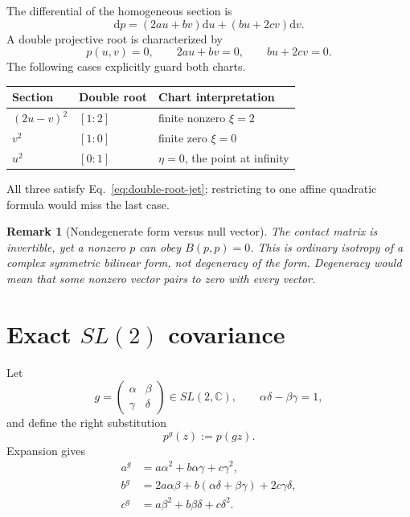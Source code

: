 \documentclass[11pt]{article}
\numberwithin{equation}{section}
\newcommand{\CC}{\mathbb C}
\newcommand{\dd}{\mathrm d}
\newtheorem{remark}[theorem]{Remark}
\begin{document}
The differential of the homogeneous section is
\begin{equation}
 \dd p=(2au+bv)\dd u+(bu+2cv)\dd v.
 \label{eq:first-jet}
\end{equation}
A double projective root is characterized by
\begin{equation}
 p(u,v)=0,
 \qquad 2au+bv=0,
 \qquad bu+2cv=0.
 \label{eq:double-root-jet}
\end{equation}
The following cases explicitly guard both charts.
\begin{center}
\begin{tabular}{@{}lll@{}}
\toprule
Section & Double root & Chart interpretation\\
\midrule
\((2u-v)^2\) & \([1:2]\) & finite nonzero \(\xi=2\)\\
\(v^2\) & \([1:0]\) & finite zero \(\xi=0\)\\
\(u^2\) & \([0:1]\) & \(\eta=0\), the point at infinity\\
\bottomrule
\end{tabular}
\end{center}
All three satisfy Eq.~\eqref{eq:double-root-jet}; restricting to one affine
quadratic formula would miss the last case.

\begin{remark}[Nondegenerate form versus null vector]
The contact matrix is invertible, yet a nonzero \(p\) can obey
\(B(p,p)=0\).  This is ordinary isotropy of a complex symmetric bilinear form,
not degeneracy of the form.  Degeneracy would mean that some nonzero vector
pairs to zero with \emph{every} vector.
\end{remark}

\section{Exact \texorpdfstring{$SL(2)$}{SL(2)} covariance}

Let
\begin{equation}
 g=\begin{pmatrix}\alpha&\beta\\\gamma&\delta\end{pmatrix}
 \in SL(2,\CC),
 \qquad \alpha\delta-\beta\gamma=1,
 \label{eq:g-matrix}
\end{equation}
and define the right substitution
\begin{equation}
 p^g(z):=p(gz).
 \label{eq:right-substitution}
\end{equation}
Expansion gives
\begin{align}
 a^g&=a\alpha^2+b\alpha\gamma+c\gamma^2,\\
 b^g&=2a\alpha\beta+b(\alpha\delta+\beta\gamma)
       +2c\gamma\delta,\\
 c^g&=a\beta^2+b\beta\delta+c\delta^2.
 \label{eq:coefficient-transform}
\end{align}
\end{document}
